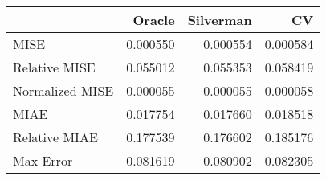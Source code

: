 \begin{tabular}{lrrr}
  \hline
 & Oracle & Silverman & CV \\ 
  \hline
MISE & 0.000550 & 0.000554 & 0.000584 \\ 
  Relative MISE & 0.055012 & 0.055353 & 0.058419 \\ 
  Normalized MISE & 0.000055 & 0.000055 & 0.000058 \\ 
  MIAE & 0.017754 & 0.017660 & 0.018518 \\ 
  Relative MIAE & 0.177539 & 0.176602 & 0.185176 \\ 
  Max Error & 0.081619 & 0.080902 & 0.082305 \\ 
   \hline
\end{tabular}
